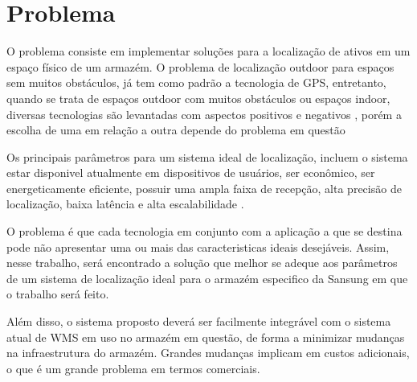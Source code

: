 \chapter{Problema}
\textual
O problema consiste em implementar soluções para a localização de ativos em um espaço físico de um armazém.
O problema de localização outdoor para espaços sem muitos obstáculos, já tem como padrão a tecnologia de GPS, entretanto, quando se trata de espaços outdoor com muitos obstáculos ou espaços indoor, diversas tecnologias são levantadas com aspectos positivos e negativos \cite{art4}, porém a escolha de uma em relação a outra depende do problema em questão

Os principais parâmetros para um sistema ideal de localização, incluem o sistema estar disponivel atualmente em dispositivos de usuários, ser econômico, ser energeticamente eficiente, possuir uma ampla faixa de recepção, alta precisão de localização, baixa latência e alta escalabilidade \cite{art2}.

O problema é que cada tecnologia em conjunto com a aplicação a que se destina pode não apresentar uma ou mais das caracteristicas ideais desejáveis. Assim, nesse trabalho, será encontrado a solução que melhor se adeque aos parâmetros de um sistema de localização ideal para o armazém especifico da Sansung em que o trabalho será feito.

Além disso, o sistema proposto deverá ser facilmente integrável com o sistema atual de WMS em uso no armazém em questão, de forma a minimizar mudanças na infraestrutura do armazém. Grandes mudanças implicam em custos adicionais, o que é um grande problema em termos comerciais.
